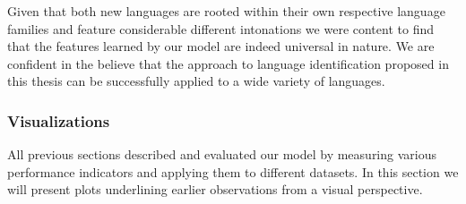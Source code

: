 Given that both new languages are rooted within their own respective language families and feature considerable different intonations we were content to find that the features learned by our model are indeed universal in nature. We are confident in the believe that the approach to language identification proposed in this thesis can be successfully applied to a wide variety of languages.

\subsubsection{Visualizations} 
\label{sec:visualization}
All previous sections described and evaluated our model by measuring various performance indicators and applying them to different datasets. In this section we will present plots underlining earlier observations from a visual perspective.
	
